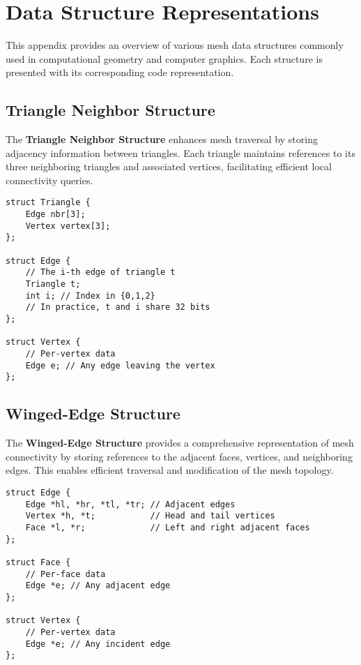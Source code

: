 \newcommand{\nocontentsline}[3]{}
\let\origcontentsline\addcontentsline
\newcommand\stoptoc{\let\addcontentsline\nocontentsline}
\newcommand\resumetoc{\let\addcontentsline\origcontentsline}

\chapter{Data Structure Representations}
\stoptoc

This appendix provides an overview of various mesh data structures commonly used in computational geometry and computer graphics. Each structure is presented with its corresponding code representation.

\section{Triangle Neighbor Structure}
\label{app:triangle-neighbor-structure}

The \textbf{Triangle Neighbor Structure} enhances mesh traversal by storing adjacency information between triangles. Each triangle maintains references to its three neighboring triangles and associated vertices, facilitating efficient local connectivity queries.

\begin{verbatim}
struct Triangle {
    Edge nbr[3];
    Vertex vertex[3];
};

struct Edge {
    // The i-th edge of triangle t
    Triangle t;
    int i; // Index in {0,1,2}
    // In practice, t and i share 32 bits
};

struct Vertex {
    // Per-vertex data
    Edge e; // Any edge leaving the vertex
};
\end{verbatim}

\section{Winged-Edge Structure}
\label{app:winged-edge-structure}

The \textbf{Winged-Edge Structure} provides a comprehensive representation of mesh connectivity by storing references to the adjacent faces, vertices, and neighboring edges. This enables efficient traversal and modification of the mesh topology.

\begin{verbatim}
struct Edge {
    Edge *hl, *hr, *tl, *tr; // Adjacent edges
    Vertex *h, *t;           // Head and tail vertices
    Face *l, *r;             // Left and right adjacent faces
};

struct Face {
    // Per-face data
    Edge *e; // Any adjacent edge
};

struct Vertex {
    // Per-vertex data
    Edge *e; // Any incident edge
};
\end{verbatim}

